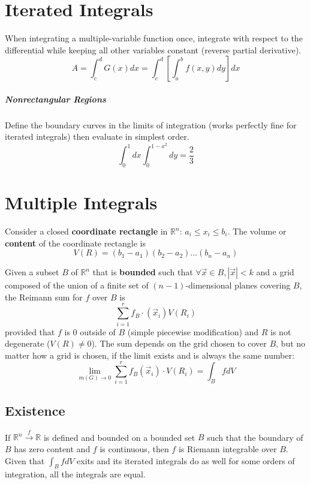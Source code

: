 \documentclass[11pt]{article}
\begin{document}
\section{Iterated Integrals}
	When integrating a multiple-variable function once, integrate with respect to the differential while keeping all other variables constant (reverse partial derivative). 
	\begin{equation}
		A = \int_c^d G(x)dx = \int_c^d\left[ \int_a^b f(x, y)dy \right]dx
	\end{equation}
	
	\subparagraph{Nonrectangular Regions} Define the boundary curves in the limits of integration (works perfectly fine for iterated integrals) then evaluate in simplest order. 
	\[\int_0^1 dx \int_0^{1-x^2} dy = \frac{2}{3}\]
	
\section{Multiple Integrals}
	Consider a closed \textbf{coordinate rectangle} in $\mathbb{R}^n$: $a_i \leq x_i \leq b_i$. The volume or \textbf{content} of the coordinate rectangle is
	\begin{equation}
		V(R) = (b_1 - a_1)(b_2 - a_2)\ldots (b_n - a_n)
	\end{equation}
	
	Given a subset $B$ of $\mathbb{R}^n$ that is \textbf{bounded} such that $\forall \vec{x}\in B, |\vec{x}| < k$ and a grid composed of the union of a finite set of $(n-1)$-dimensional planes covering $B$, the Reimann sum for $f$ over $B$ is
	\begin{equation}
		\sum_{i=1}^r f_B \cdot (\vec{x}_i)V(R_i)
	\end{equation}
	provided that $f$ is 0 outside of $B$ (simple piecewise modification) and $R$ is not degenerate ($V(R) \neq 0$). The sum depends on the grid chosen to cover $B$, but no matter how a grid is chosen, if the limit exists and is always the same number:
	\begin{equation}
		\lim_{m(G) \rightarrow 0} \sum_{i=1}^r f_B (\vec{x}_i) \cdot V(R_i) = \int_B fdV
	\end{equation}
	
	\subsection{Existence}
		If $\mathbb{R}^n \xrightarrow{f} \mathbb{R}$ is defined and bounded on a bounded set $B$ such that the boundary of $B$ has zero content and $f$ is continuous, then $f$ is Riemann integrable over $B$. Given that $\int_B fdV$ exits and its iterated integrals do as well for some orders of integration, all the integrals are equal. 
		
\end{document}
